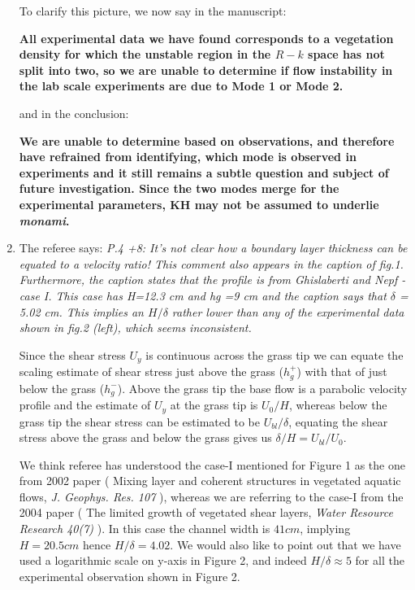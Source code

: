 \documentclass[letterpaper,10pt]{article}
\newcommand{\Rey}{{R}}
\newcommand{\monami}{\textit{monami}}
\begin{document}
\begin{enumerate}
To clarify this picture, we now say in the manuscript:

\noindent
\textbf{All experimental data we have found corresponds to a vegetation density for which the unstable region in the $\Rey-k$ space has not split into two, so we are unable to determine if flow instability in the lab scale experiments \citep{Ghisal02} are due to Mode 1 or Mode 2.}

and in the conclusion:

\noindent
\textbf{
We are unable to determine based on observations, and therefore have refrained from identifying, which mode is observed in experiments and it still remains a subtle question and subject of future investigation. Since the two modes merge for the experimental parameters, KH may not be assumed to underlie \monami.
}

\item The referee says:
\textit{
P.4 +8: It's not clear how a boundary layer thickness can be equated to a velocity ratio! This comment also appears in the caption of fig.1. Furthermore, the caption states that the profile is from Ghislaberti and Nepf - case I. This case has H=12.3 cm and hg =9 cm and the caption says that $\delta$
= 5.02 cm. This implies an $H/\delta$ rather lower than any of the experimental
data shown in fig.2 (left), which seems inconsistent.
}

Since the shear stress $U_y$ is continuous across the grass tip we can equate the scaling estimate of shear stress just above the grass  ($h_g^+$) with that of just below the grass ($h_g^{-}$). 
Above the grass tip the base flow is a parabolic velocity profile and the estimate of $U_y$ at the grass tip is $U_0/H$, whereas below the grass tip the shear stress can be estimated to be $U_{bl}/\delta$, equating the shear stress above the grass and below the grass gives us $\delta/H = U_{bl}/U_0$.

We think referee has understood the case-I mentioned for Figure 1 as the one from 2002 paper ( Mixing layer and coherent structures in vegetated aquatic flows, \textit{J. Geophys. Res. 107} ), whereas we are referring to the case-I from the 2004 paper ( The limited growth of vegetated shear layers, \textit{Water Resource Research 40(7)} ). In this case the channel width is $41cm$, implying $H=20.5 cm$ hence $H/\delta=4.02$. We would also like to point out that we have used a logarithmic scale on y-axis in Figure 2, and indeed $H/\delta \approx 5$ for all the experimental observation shown in Figure 2.


\end{enumerate}
\end{document}
